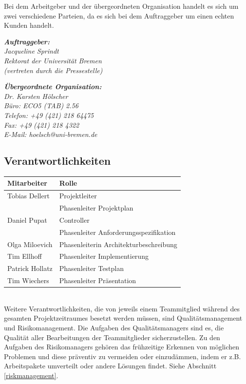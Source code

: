 \documentclass[fontsize=12pt,paper=a4,twoside]{scrartcl}
\begin{document}
Bei dem Arbeitgeber und der übergeordneten Organisation handelt es sich um zwei verschiedene Parteien, da es sich bei dem Auftraggeber um einen echten Kunden handelt.

{\em \textbf{Auftraggeber:}\\
	Jacqueline Sprindt\\
	Rektorat der Universität Bremen\\
	(vertreten durch die Pressestelle)\\
}

{\em \textbf{Übergeordnete Organisation:}\\ 
	Dr. Karsten Hölscher\\
	Büro: ECO5 (TAB) 2.56\\
    Telefon: +49 (421) 218 64475 \\
    Fax: +49 (421) 218 4322 \\
	E-Mail: hoelsch@uni-bremen.de 
}



\subsection{Verantwortlichkeiten}
\begin{tabular}{|l|l|}
\hline
\textbf{Mitarbeiter} & \textbf{Rolle} \\
\hline
Tobias Dellert & Projektleiter \\
 & Phasenleiter Projektplan \\
\hline
Daniel Pupat & Controller \\
& Phasenleiter  Anforderungsspezifikation \\ 
\hline
Olga Miloevich & Phasenleiterin Architekturbeschreibung \\
\hline
Tim Ellhoff & Phasenleiter Implementierung \\
\hline
Patrick Hollatz & Phasenleiter Testplan \\
\hline
Tim Wiechers & Phasenleiter Präsentation\\
\hline
\end{tabular} \\

Weitere Verantwortlichkeiten, die von jeweils einem Teammitglied während des gesamten Projektzeitraumes besetzt werden müssen, sind Qualitätsmanagement und Risikomanagement.
Die Aufgaben des Qualitätsmanagers sind es, die Qualität aller Bearbeitungen der Teammitglieder sicherzustellen.
Zu den Aufgaben des Risikomanagers gehören das frühzeitige Erkennen von möglichen Problemen und diese präventiv zu vermeiden oder einzudämmen, indem er z.B. Arbeitspakete umverteilt oder andere Lösungen findet. Siehe Abschnitt \ref{riskmanagement}.
\end{document}
